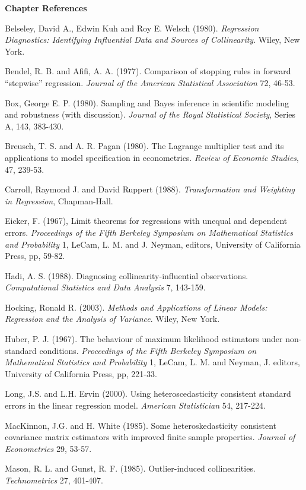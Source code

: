 \textbf{Chapter References}
\begin{multicols}{2}

Belseley, David A., Edwin Kuh and Roy E. Welsch (1980).
\textit{Regression Diagnostics: Identifying Influential Data and
Sources of Collinearity}. Wiley, New York.

Bendel, R. B. and Afifi, A. A. (1977). Comparison of stopping rules
in forward ``stepwise'' regression. \textit{Journal of the American
Statistical Association} 72, 46-53.

Box, George E. P. (1980). Sampling and Bayes inference in scientific
modeling and robustness (with discussion). \textit{Journal of the
Royal Statistical Society}, Series A, 143, 383-430.

Breusch, T. S. and A. R. Pagan (1980).  The Lagrange multiplier test
and its applications to model specification in econometrics.
\textit{Review of Economic Studies}, 47, 239-53.

Carroll, Raymond J. and David Ruppert (1988). \textit{Transformation
and Weighting in Regression}, Chapman-Hall.

Eicker, F. (1967), Limit theorems for regressions with unequal and
dependent errors.  \textit{Proceedings of the Fifth Berkeley
Symposium on Mathematical Statistics and Probability} 1, LeCam, L.
M. and J. Neyman, editors, University of California Press, pp,
59-82.

Hadi, A. S. (1988). Diagnosing collinearity-influential
observations. \textit{Computational Statistics and Data Analysis} 7,
143-159.

Hocking, Ronald R. (2003). \textit{Methods and Applications of
Linear Models: Regression and the Analysis of Variance}. Wiley, New
York.

Huber, P. J. (1967). The behaviour of maximum likelihood estimators
under non-standard conditions. \textit{Proceedings of the Fifth
Berkeley Symposium on Mathematical Statistics and Probability} 1,
LeCam, L. M. and Neyman, J. editors, University of California Press,
pp, 221-33.

Long, J.S. and L.H. Ervin (2000). Using heteroscedasticity
consistent standard errors in the linear regression model.
\textit{American Statistician} 54, 217-224.

MacKinnon, J.G. and H. White (1985). Some heteroskedasticity
consistent covariance matrix estimators with improved finite sample
properties. \textit{Journal of Econometrics} 29, 53-57.

Mason, R. L. and Gunst, R. F. (1985). Outlier-induced
collinearities. \textit{Technometrics} 27, 401-407.


\end{multicols}
